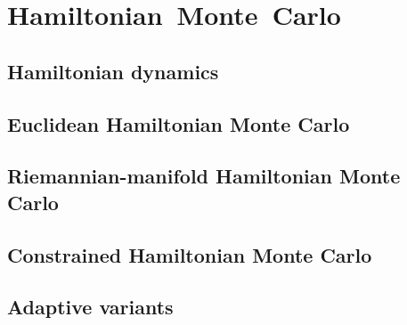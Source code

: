 \chapter{\mbox{Hamiltonian Monte Carlo}}\label{ch:hamiltonian-monte-carlo}

\section{Hamiltonian dynamics}

\section{Euclidean Hamiltonian Monte Carlo}

\section{Riemannian-manifold Hamiltonian Monte Carlo}

\section{Constrained Hamiltonian Monte Carlo}

\section{Adaptive variants}